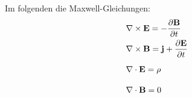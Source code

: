 \documentclass{scrartcl}
\begin{document}
Im folgenden die Maxwell-Gleichungen:
\begin{align}
  &\nabla \times \mathbf{E} = - \frac{\partial \mathbf{B}}{\partial t}
  \\
  &\nabla \times \mathbf{B} = \mathbf{j} + \frac{\partial \mathbf{E}}{\partial t}
  \\
  &\nabla \cdot \mathbf{E} = \rho \vphantom{\frac{\partial \mathbf{E}}{\partial t}}
  \\
  &\nabla \cdot \mathbf{B} = 0 \vphantom{\frac{\partial \mathbf{E}}{\partial t}}
\end{align}
\end{document}
